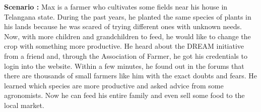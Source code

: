 \begin{flushleft}
\textbf{Scenario :} 
Max is a farmer who cultivates some fields near his house in Telangana state. During the past years, he planted the same species of plants in his lands because he was scared of trying different ones with unknown needs. Now, with more children and grandchildren to feed, he would like to change the crop with something more productive. 
He heard about the DREAM initiative from a friend and, through the Association of Farmer, he got his credentials to login into the website.
Within a few minutes, he found out in the forums that there are thousands of small farmers like him with the exact doubts and fears.
He learned which species are more productive and asked advice from some agronomists.
Now he can feed his entire family and even sell some food to the local market.
\end{flushleft}